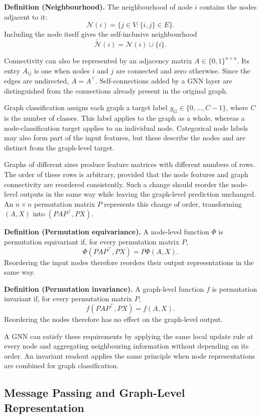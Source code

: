 \documentclass[11pt,a4paper]{article}
\begin{document}
\medskip
\noindent\textbf{Definition (Neighbourhood).} The neighbourhood of node \(i\) contains the nodes adjacent to it:
\[
\mathcal{N}(i)=\{j\in V:\{i,j\}\in E\}.
\]
Including the node itself gives the self-inclusive neighbourhood
\[
\widetilde{\mathcal{N}}(i)=\mathcal{N}(i)\cup\{i\}.
\]

Connectivity can also be represented by an adjacency matrix \(A\in\{0,1\}^{n\times n}\). Its entry \(A_{ij}\) is one when nodes \(i\) and \(j\) are connected and zero otherwise. Since the edges are undirected, \(A=A^\top\). Self-connections added by a GNN layer are distinguished from the connections already present in the original graph.

Graph classification assigns each graph a target label \(y_G\in\{0,\ldots,C-1\}\), where \(C\) is the number of classes. This label applies to the graph as a whole, whereas a node-classification target applies to an individual node. Categorical node labels may also form part of the input features, but these describe the nodes and are distinct from the graph-level target.

Graphs of different sizes produce feature matrices with different numbers of rows. The order of these rows is arbitrary, provided that the node features and graph connectivity are reordered consistently. Such a change should reorder the node-level outputs in the same way while leaving the graph-level prediction unchanged. An \(n\times n\) permutation matrix \(P\) represents this change of order, transforming \((A,X)\) into \((PAP^\top,PX)\).

\medskip
\noindent\textbf{Definition (Permutation equivariance).} A node-level function \(\Phi\) is permutation equivariant if, for every permutation matrix \(P\),
\[
\Phi(PAP^\top,PX)=P\Phi(A,X).
\]
Reordering the input nodes therefore reorders their output representations in the same way.

\medskip
\noindent\textbf{Definition (Permutation invariance).} A graph-level function \(f\) is permutation invariant if, for every permutation matrix \(P\),
\[
f(PAP^\top,PX)=f(A,X).
\]
Reordering the nodes therefore has no effect on the graph-level output.

A GNN can satisfy these requirements by applying the same local update rule at every node and aggregating neighbouring information without depending on its order. An invariant readout applies the same principle when node representations are combined for graph classification.

\subsection{Message Passing and Graph-Level Representation}
\label{sec:message-passing}
\end{document}

